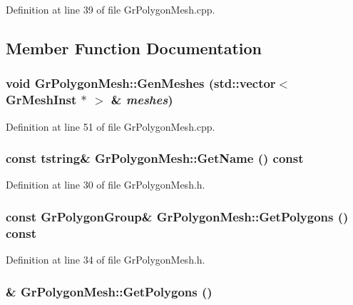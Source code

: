 Definition at line 39 of file GrPolygonMesh.cpp.

\subsection{Member Function Documentation}
\hypertarget{class_gr_polygon_mesh_49aba3242b4fc2c3c00496652f9830f4}{
\subsubsection[{GenMeshes}]{\setlength{\rightskip}{0pt plus 5cm}void GrPolygonMesh::GenMeshes (std::vector$<$ {\bf GrMeshInst} $\ast$ $>$ \& {\em meshes})}}
\label{class_gr_polygon_mesh_49aba3242b4fc2c3c00496652f9830f4}




Definition at line 51 of file GrPolygonMesh.cpp.\hypertarget{class_gr_polygon_mesh_2a5e0fdcdada59995926c7a5228b8c83}{
\subsubsection[{GetName}]{\setlength{\rightskip}{0pt plus 5cm}const {\bf tstring}\& GrPolygonMesh::GetName () const}}
\label{class_gr_polygon_mesh_2a5e0fdcdada59995926c7a5228b8c83}




Definition at line 30 of file GrPolygonMesh.h.\hypertarget{class_gr_polygon_mesh_5eeb6f79723dd4cc8ac27928b1edf016}{
\subsubsection[{GetPolygons}]{\setlength{\rightskip}{0pt plus 5cm}const {\bf GrPolygonGroup}\& GrPolygonMesh::GetPolygons () const}}
\label{class_gr_polygon_mesh_5eeb6f79723dd4cc8ac27928b1edf016}




Definition at line 34 of file GrPolygonMesh.h.\hypertarget{class_gr_polygon_mesh_e5d2b80dc774c03bd1ff368bf7c56fdd}{
\subsubsection[{GetPolygons}]{\& GrPolygonMesh::GetPolygons ()}}
\label{class_gr_polygon_mesh_e5d2b80dc774c03bd1ff368bf7c56fdd}




